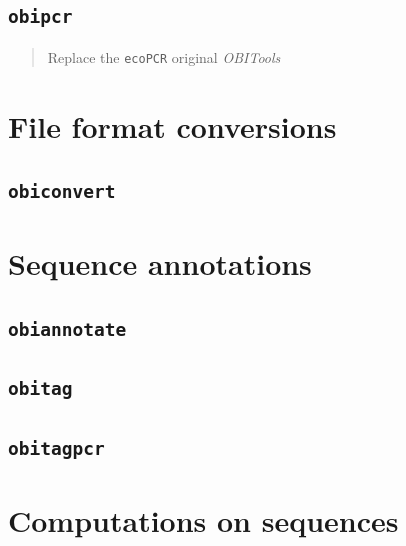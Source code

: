 \documentclass[
  letterpaper,
  DIV=11,
  numbers=noendperiod]{scrreprt}
\begin{document}
\hypertarget{obipcr}{%
\section{\texorpdfstring{\texttt{obipcr}}{obipcr}}\label{obipcr}}

\begin{quote}
Replace the \texttt{ecoPCR} original \emph{OBITools}
\end{quote}

\hypertarget{file-format-conversions}{%
\chapter{File format conversions}\label{file-format-conversions}}

\hypertarget{obiconvert}{%
\section{\texorpdfstring{\texttt{obiconvert}}{obiconvert}}\label{obiconvert}}

\hypertarget{sequence-annotations}{%
\chapter{Sequence annotations}\label{sequence-annotations}}

\hypertarget{obiannotate}{%
\section{\texorpdfstring{\texttt{obiannotate}}{obiannotate}}\label{obiannotate}}

\hypertarget{obitag}{%
\section{\texorpdfstring{\texttt{obitag}}{obitag}}\label{obitag}}

\hypertarget{obitagpcr}{%
\section{\texorpdfstring{\texttt{obitagpcr}}{obitagpcr}}\label{obitagpcr}}

\hypertarget{computations-on-sequences}{%
\chapter{Computations on sequences}\label{computations-on-sequences}}
\end{document}
